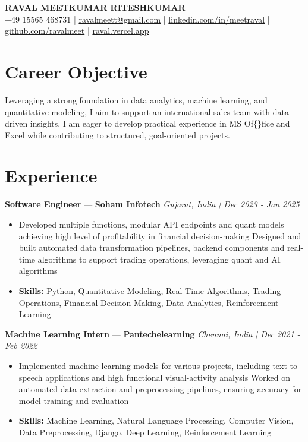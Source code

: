 \documentclass[a4paper,10pt]{article}
\begin{document}
\begin{center}
  {\Large\bfseries RAVAL MEETKUMAR RITESHKUMAR}\\[2pt]
  {\small +49 15565 468731 \;|\; \href{mailto:ravalmeett@gmail.com}{ravalmeett@gmail.com} \;|\; \href{https://www.linkedin.com/in/meetraval/}{linkedin.com/in/meetraval} \;|\; \href{https://github.com/ravalmeet}{github.com/ravalmeet} \;|\; \href{https://raval.vercel.app/}{raval.vercel.app}}
\end{center}
\vspace{-3pt}

\section*{Career Objective}
Leveraging a strong foundation in data analytics, machine learning, and quantitative modeling, I aim to support an international sales team with data-driven insights. I am eager to develop practical experience in MS Of\{\}fice and Excel while contributing to structured, goal-oriented projects.\par

\section*{Experience}
\textbf{Software Engineer} — \textbf{Soham Infotech} \hfill \textit{Gujarat, India \;|\; Dec 2023 - Jan 2025}\par
\vspace{1pt}
\begin{itemize}
  \item Developed multiple functions, modular API endpoints and quant models achieving high level of profitability in financial decision-making Designed and built automated data transformation pipelines, backend components and real-time algorithms to support trading operations, leveraging quant and AI algorithms
  \item \textbf{Skills:} Python, Quantitative Modeling, Real-Time Algorithms, Trading Operations, Financial Decision-Making, Data Analytics, Reinforcement Learning
\end{itemize}
\vspace{3pt}
\textbf{Machine Learning Intern} — \textbf{Pantechelearning} \hfill \textit{Chennai, India \;|\; Dec 2021 - Feb 2022}\par
\vspace{1pt}
\begin{itemize}
  \item Implemented machine learning models for various projects, including text-to-speech applications and high functional visual-activity analysis Worked on automated data extraction and preprocessing pipelines, ensuring accuracy for model training and evaluation
  \item \textbf{Skills:} Machine Learning, Natural Language Processing, Computer Vision, Data Preprocessing, Django, Deep Learning, Reinforcement Learning
\end{itemize}
\end{document}
